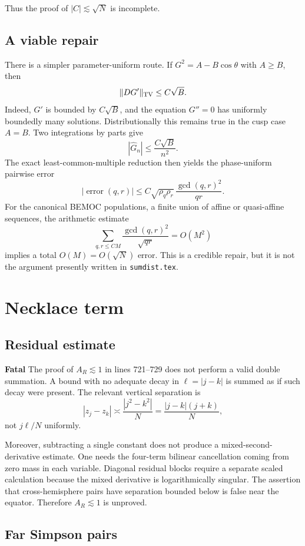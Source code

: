 \documentclass[11pt]{article}
\newcommand{\fatal}{\textbf{Fatal}}
\begin{document}
Thus the proof of $|C|\lesssim\sqrt N$ is incomplete.

\subsection{A viable repair}

There is a simpler parameter-uniform route.  If
$G^2=A-B\cos\theta$ with $A\ge B$, then
\[
 \|DG'\|_{\rm TV}\le C\sqrt B.
\]
Indeed, $G'$ is bounded by $C\sqrt B$, and the equation $G''=0$ has uniformly
boundedly many solutions.  Distributionally this remains true in the cusp
case $A=B$.  Two integrations by parts give
\[
 |\widehat G_n|\le\frac{C\sqrt B}{n^2}.
\]
The exact least-common-multiple reduction then yields the phase-uniform
pairwise error
\[
 |\operatorname{error}(q,r)|
 \le C\sqrt{\rho_q\rho_r}\,
 \frac{\gcd(q,r)^2}{qr}.
\]
For the canonical BEMOC populations, a finite union of affine or
quasi-affine sequences, the arithmetic estimate
\[
 \sum_{q,r\le CM}\frac{\gcd(q,r)^2}{\sqrt{qr}}=O(M^2)
\]
implies a total $O(M)=O(\sqrt N)$ error.  This is a credible repair, but it is
not the argument presently written in \texttt{sumdist.tex}.

\section{Necklace term}

\subsection{Residual estimate}

\fatal{} The proof of $A_R\lesssim1$ in lines 721--729 does not perform a
valid double summation.  A bound with no adequate decay in
$\ell=|j-k|$ is summed as if such decay were present.  The relevant vertical
separation is
\[
 |z_j-z_k|\asymp\frac{|j^2-k^2|}{N}
 =\frac{|j-k|(j+k)}N,
\]
not $j\ell/N$ uniformly.

Moreover, subtracting a single constant does not produce a mixed-second-
derivative estimate.  One needs the four-term bilinear cancellation coming
from zero mass in each variable.  Diagonal residual blocks require a separate
scaled calculation because the mixed derivative is logarithmically singular.
The assertion that cross-hemisphere pairs have separation bounded below is
false near the equator.  Therefore $A_R\lesssim1$ is unproved.

\subsection{Far Simpson pairs}
\end{document}

